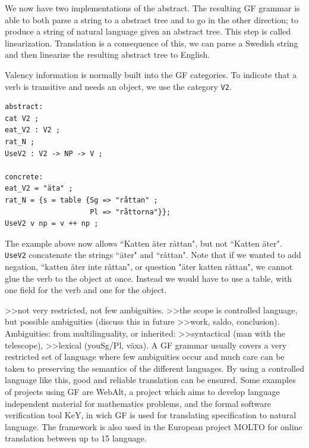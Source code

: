 \documentclass{report}
\begin{document}

We now have two implementations of the abstract. The resulting GF grammar is able to
both parse a string to a abstract tree and to go in the other direction; to produce
a string of natural language given an abstract tree. This step is called linearization.
Translation is a consequence of this, we can parse a Swedish string and then 
linearize the resulting abstract tree to English. 

Valency information is normally built into the GF categories. To indicate that
a verb is transitive and needs an object, we use the category \verb_V2_.
\begin{verbatim}
abstract:
cat V2 ; 
eat_V2 : V2 ;
rat_N ;
UseV2 : V2 -> NP -> V ;

concrete:
eat_V2 = "äta" ;
rat_N = {s = table {Sg => "råttan" ;
                    Pl => "råttorna"}};
UseV2 v np = v ++ np ;
\end{verbatim}

The example above now allows ``Katten äter råttan", but not ``Katten äter".
\verb|UseV2| concatenate the strings ``äter" and ``råttan". Note that if we
wanted to add negation, ``katten äter inte råttan", or question "äter katten råttan",
we cannot glue the verb to the object at once. Instead we would have to use a table,
with one field for the verb and one for the object. 




>>not very restricted, not few ambiguities.
>>the scope is controlled language, but possible ambiguities (discuss this in future
>>work, saldo, conclusion). Ambiguities: from multilinguality, or inherited:
>>syntactical (man with the telescope), 
>>lexical (youSg/Pl, växa).
A GF grammar usually covers a very restricted set of language where few ambiguities
occur and much care can be taken to preserving the semantics of the
different languages.
By using a controlled language like this,  good and reliable translation can be
ensured. Some examples of projects using GF are WebAlt\cite{webalt},
a project which aims to develop language independent material for mathematics problems,
and the formal software verification tool KeY\cite{key}, in wich GF is used for
translating specification to natural language.
The framework is also used in the
European project MOLTO\cite{molto} for online translation between up to 15 language.\\
\end{document}
